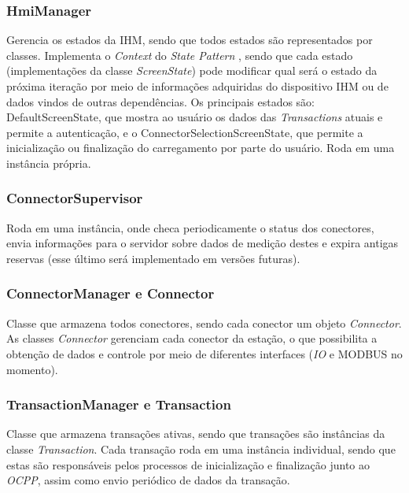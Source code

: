         \subsubsection{HmiManager}
          Gerencia os estados da \ac{IHM}, sendo que todos estados são representados por classes. Implementa o \textit{Context} do \textit{State Pattern} \cite{book-gof}, sendo que cada estado (implementações da classe \textit{ScreenState}) pode modificar qual será o estado da próxima iteração por meio de informações adquiridas do dispositivo \ac{IHM} ou de dados vindos de outras dependências. Os principais estados são: DefaultScreenState, que mostra ao usuário os dados das \textit{Transactions} atuais e permite a autenticação, e o ConnectorSelectionScreenState, que permite a inicialização ou finalização do carregamento por parte do usuário. Roda em uma instância própria.
        \subsubsection{ConnectorSupervisor}
          Roda em uma instância, onde checa periodicamente o status dos conectores, envia informações para o servidor sobre dados de medição destes e expira antigas reservas (esse último será implementado em versões futuras).
        \subsubsection{ConnectorManager e Connector}
          Classe que armazena todos conectores, sendo cada conector um objeto \textit{Connector}. As classes \textit{Connector} gerenciam cada conector da estação, o que possibilita a obtenção de dados e controle por meio de diferentes interfaces (\textit{\ac{IO}} e MODBUS no momento).
        \subsubsection{TransactionManager e Transaction}
          Classe que armazena transações ativas, sendo que transações são instâncias da classe \textit{Transaction}. Cada transação roda em uma instância individual, sendo que estas são responsáveis pelos processos de inicialização e finalização junto ao \textit{\ac{OCPP}}, assim como envio periódico de dados da transação.

